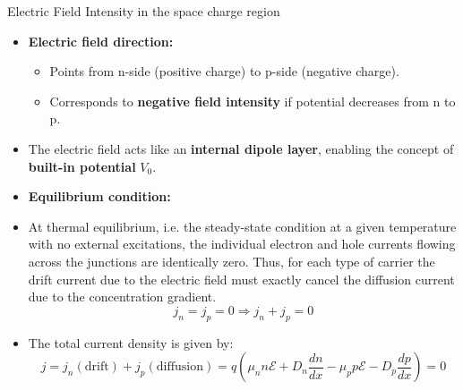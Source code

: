 \begin{frame}{Electric Field Intensity in the space charge region}
    \begin{itemize}
        \item \textbf{Electric field direction:}
        \begin{itemize}
            \item Points from n-side (positive charge) to p-side (negative charge).
            \item Corresponds to \textbf{negative field intensity} if potential decreases from n to p.
        \end{itemize}
        \item The electric field acts like an \textbf{internal dipole layer}, enabling the concept of \textbf{built-in potential} $V_0$.
		\item \textbf{Equilibrium condition:}
        \item At thermal equilibrium, i.e. the steady-state condition at a given temperature with no external excitations, the
		individual electron and hole currents flowing across the junctions are identically zero. Thus, for each type of
		carrier the drift current due to the electric field must exactly cancel the diffusion current due to the concentration
		gradient.
		\begin{equation}
			j_n = j_p = 0 \Rightarrow j_n + j_p = 0
		\end{equation}
		\item The total current density is given by:
		\begin{equation}
			j = j_n (\text{drift}) + j_p (\text{diffusion}) = q \left( \mu_n n \mathcal{E} + D_n \frac{dn}{dx} - \mu_p p \mathcal{E} - D_p \frac{dp}{dx} \right) = 0
		\end{equation}
    \end{itemize}
\end{frame}

